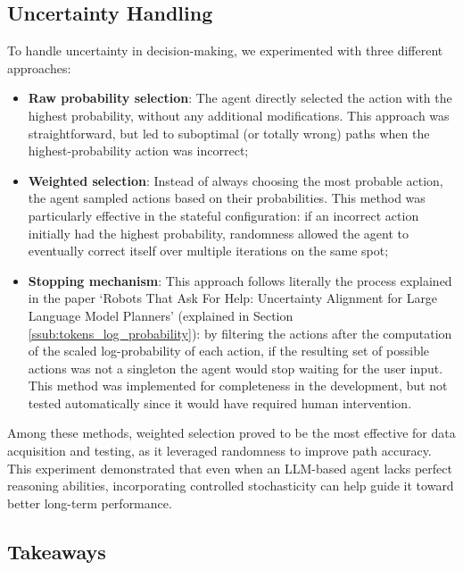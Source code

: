 \subsection{Uncertainty Handling}
To handle uncertainty in decision-making, we experimented with three different
approaches:
\begin{itemize}
  \item \textbf{Raw probability selection}: The agent directly selected the action
    with the highest probability, without any additional modifications. This approach
    was straightforward, but led to suboptimal (or totally wrong) paths when the
    highest-probability action was incorrect;

  \item \textbf{Weighted selection}: Instead of always choosing the most probable
    action, the agent sampled actions based on their probabilities. This method was
    particularly effective in the stateful configuration: if an incorrect action
    initially had the highest probability, randomness allowed the agent to eventually
    correct itself over multiple iterations on the same spot;

  \item \textbf{Stopping mechanism}: This approach follows literally the process
    explained in the paper `Robots That Ask For Help: Uncertainty Alignment for Large
    Language Model Planners' (explained in Section \ref{ssub:tokens_log_probability}):
    by filtering the actions after the computation of the scaled log-probability
    of each action, if the resulting set of possible actions was not a singleton
    the agent would stop waiting for the user input. This method was implemented
    for completeness in the development, but not tested automatically since it
    would have required human intervention.
\end{itemize}
Among these methods, weighted selection proved to be the most effective for data
acquisition and testing, as it leveraged randomness to improve path accuracy.
This experiment demonstrated that even when an LLM-based agent lacks perfect
reasoning abilities, incorporating controlled stochasticity can help guide it toward
better long-term performance.

\subsection{Takeaways}

